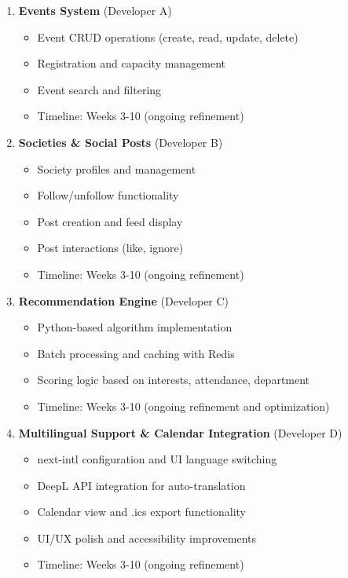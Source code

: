 \documentclass[12pt,a4paper]{article}
\begin{document}
\begin{enumerate}
    \item \textbf{Events System} (Developer A)
    \begin{itemize}
        \item Event CRUD operations (create, read, update, delete)
        \item Registration and capacity management
        \item Event search and filtering
        \item Timeline: Weeks 3-10 (ongoing refinement)
    \end{itemize}

    \item \textbf{Societies \& Social Posts} (Developer B)
    \begin{itemize}
        \item Society profiles and management
        \item Follow/unfollow functionality
        \item Post creation and feed display
        \item Post interactions (like, ignore)
        \item Timeline: Weeks 3-10 (ongoing refinement)
    \end{itemize}

    \item \textbf{Recommendation Engine} (Developer C)
    \begin{itemize}
        \item Python-based algorithm implementation
        \item Batch processing and caching with Redis
        \item Scoring logic based on interests, attendance, department
        \item Timeline: Weeks 3-10 (ongoing refinement and optimization)
    \end{itemize}

    \item \textbf{Multilingual Support \& Calendar Integration} (Developer D)
    \begin{itemize}
        \item next-intl configuration and UI language switching
        \item DeepL API integration for auto-translation
        \item Calendar view and .ics export functionality
        \item UI/UX polish and accessibility improvements
        \item Timeline: Weeks 3-10 (ongoing refinement)
    \end{itemize}
\end{enumerate}
\end{document}
